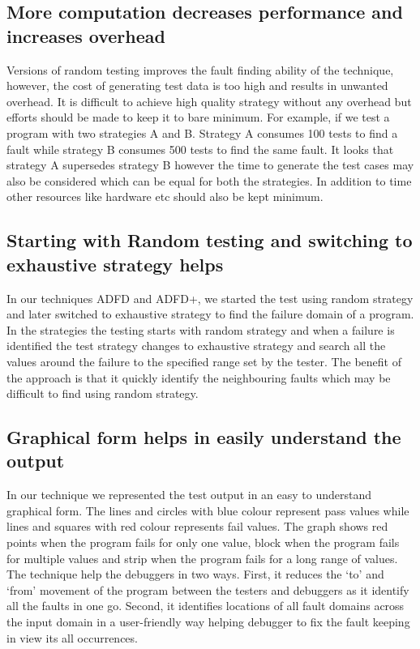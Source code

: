 \subsection{More computation decreases performance and increases overhead}
Versions of random testing \cite{} improves the fault finding ability of the technique, however, the cost of generating test data is too high and results in unwanted overhead. It is difficult to achieve high quality strategy without any overhead but efforts should be made to keep it to bare minimum. For example, if we test a program with two strategies A and B. Strategy A consumes 100 tests to find a fault while strategy B consumes 500 tests to find the same fault.  It looks that strategy A supersedes strategy B however the time to generate the test cases may also be considered which can be equal for both the strategies. In addition to time other resources like hardware etc should also be kept minimum.


\subsection{Starting with Random testing and switching to exhaustive strategy helps}
In our techniques ADFD and ADFD+, we started the test using random strategy and later switched to exhaustive strategy to find the failure domain of a program. In the strategies the testing starts with random strategy and when a failure is identified the test strategy changes to exhaustive strategy and search all the values around the failure to the specified range set by the tester. The benefit of the approach is that it quickly identify the neighbouring faults which may be difficult to find using random strategy. 


\subsection{Graphical form helps in easily understand the output}
In our technique we represented the test output in an easy to understand graphical form. The lines and circles with blue colour represent pass values while lines and squares with red colour represents fail values. The graph shows red points when the program fails for only one value, block when the program fails for multiple values and strip when the program fails for a long range of values.  The technique help the debuggers in two ways. First, it reduces the `to' and `from' movement of the program between the testers and debuggers as it identify all the faults in one go. Second, it identifies locations of all fault domains across the input domain in a user-friendly way helping debugger to fix the fault keeping in view its all occurrences.

